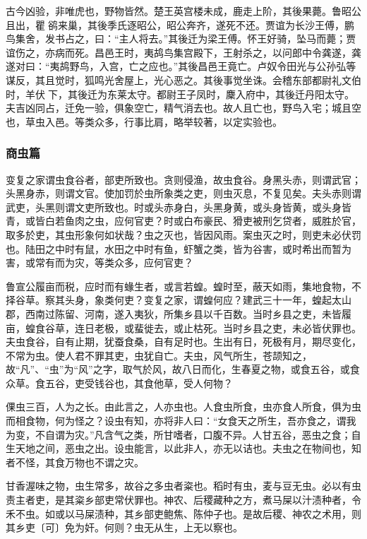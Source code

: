 \documentclass[]{article}
\begin{document}
古今凶验，非唯虎也，野物皆然。楚王英宫楼未成，鹿走上阶，其後果薨。鲁昭公且出，瞿鹆来巢，其後季氏逐昭公，昭公奔齐，遂死不还。贾谊为长沙王傅，鹏鸟集舍，发书占之，曰：``主人将去。''其後迁为梁王傅。怀王好骑，坠马而薨；贾谊伤之，亦病而死。昌邑王时，夷鸪鸟集宫殿下，王射杀之，以问郎中令龚遂，龚遂对曰：``夷鸪野鸟，入宫，亡之应也。''其後昌邑王竟亡。卢奴令田光与公孙弘等谋反，其且觉时，狐鸣光舍屋上，光心恶之。其後事觉坐诛。会稽东部都尉礼文伯时，羊伏下，其後迁为东莱太守。都尉王子凤时，麇入府中，其後迁丹阳太守。夫吉凶同占，迁免一验，俱象空亡，精气消去也。故人且亡也，野鸟入宅；城且空也，草虫入邑。等类众多，行事比肩，略举较著，以定实验也。

\hypertarget{header-n705}{%
\subsubsection{商虫篇}\label{header-n705}}

变复之家谓虫食谷者，部吏所致也。贪则侵渔，故虫食谷。身黑头赤，则谓武官；头黑身赤，则谓文官。使加罚於虫所象类之吏，则虫灭息，不复见矣。夫头赤则谓武吏，头黑则谓文吏所致也。时或头赤身白，头黑身黄，或头身皆黄，或头身皆青，或皆白若鱼肉之虫，应何官吏？时或白布豪民、猾吏被刑乞贷者，威胜於官，取多於吏，其虫形象何如状哉？虫之灭也，皆因风雨。案虫灭之时，则吏未必伏罚也。陆田之中时有鼠，水田之中时有鱼，虾蟹之类，皆为谷害，或时希出而暂为害，或常有而为灾，等类众多，应何官吏？

鲁宣公履亩而税，应时而有蝝生者，或言若蝗。蝗时至，蔽天如雨，集地食物，不择谷草。察其头身，象类何吏？变复之家，谓蝗何应？建武三十一年，蝗起太山郡，西南过陈留、河南，遂入夷狄，所集乡县以千百数。当时乡县之吏，未皆履亩，蝗食谷草，连日老极，或蜚徙去，或止枯死。当时乡县之吏，未必皆伏罪也。夫虫食谷，自有止期，犹蚕食桑，自有足时也。生出有日，死极有月，期尽变化，不常为虫。使人君不罪其吏，虫犹自亡。夫虫，风气所生，苍颉知之，故``凡''、``虫''为``风''之字，取气於风，故八日而化，生春夏之物，或食五谷，或食众草。食五谷，吏受钱谷也，其食他草，受人何物？

倮虫三百，人为之长。由此言之，人亦虫也。人食虫所食，虫亦食人所食，俱为虫而相食物，何为怪之？设虫有知，亦将非人曰：``女食天之所生，吾亦食之，谓我为变，不自谓为灾。''凡含气之类，所甘嗜者，口腹不异。人甘五谷，恶虫之食；自生天地之间，恶虫之出。设虫能言，以此非人，亦无以诘也。夫虫之在物间也，知者不怪，其食万物也不谓之灾。

甘香渥味之物，虫生常多，故谷之多虫者粢也。稻时有虫，麦与豆无虫。必以有虫责主者吏，是其粢乡部吏常伏罪也。神农、后稷藏种之方，煮马屎以汁渍种者，令禾不虫。如或以马屎渍种，其乡部吏鲍焦、陈仲子也。是故后稷、神农之术用，则其乡吏〔可〕免为奸。何则？虫无从生，上无以察也。
\end{document}
